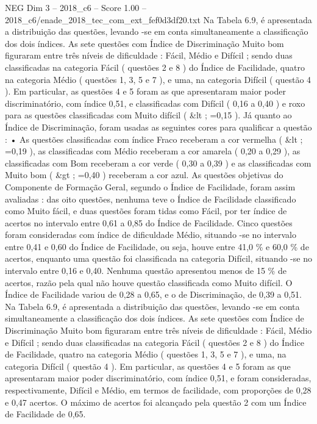 \begin{textsample}{NEG Dim 3 – 2018\_c6 – Score 1.00 – 2018\_c6/enade\_2018\_tec\_com\_ext\_fef0d3df20.txt}
Na Tabela 6.9, é apresentada a distribuição das questões, levando -se em conta simultaneamente a classificação dos dois índices.
As sete questões com Índice de Discriminação Muito bom figuraram entre três níveis de dificuldade : Fácil, Médio e Difícil ; sendo duas classificadas na categoria Fácil ( questões 2 e 8 ) do Índice de Facilidade, quatro na categoria Médio ( questões 1, 3, 5 e 7 ), e uma, na categoria Difícil ( questão 4 ).
Em particular, as questões 4 e 5 foram as que apresentaram maior poder discriminatório, com índice 0,51, e classificadas com Difícil ( 0,16 a 0,40 ) e roxo para as questões classificadas com Muito difícil ( \&lt ; =0,15 ).
Já quanto ao Índice de Discriminação, foram usadas as seguintes cores para qualificar a questão : • As questões classificadas com índice Fraco receberam a cor vermelha ( \&lt ; =0,19 ), as classificadas com Médio receberam a cor amarela ( 0,20 a 0,29 ), as classificadas com Bom receberam a cor verde ( 0,30 a 0,39 ) e as classificadas com Muito bom ( \&gt ; =0,40 ) receberam a cor azul.
As questões objetivas do Componente de Formação Geral, segundo o Índice de Facilidade, foram assim avaliadas : das oito questões, nenhuma teve o Índice de Facilidade classificado como Muito fácil, e duas questões foram tidas como Fácil, por ter índice de acertos no intervalo entre 0,61 a 0,85 do Índice de Facilidade.
Cinco questões foram consideradas com índice de dificuldade Médio, situando -se no intervalo entre 0,41 e 0,60 do Índice de Facilidade, ou seja, houve entre 41,0 \% e 60,0 \% de acertos, enquanto uma questão foi classificada na categoria Difícil, situando -se no intervalo entre 0,16 e 0,40.
Nenhuma questão apresentou menos de 15 \% de acertos, razão pela qual não houve questão classificada como Muito difícil.
O Índice de Facilidade variou de 0,28 a 0,65, e o de Discriminação, de 0,39 a 0,51.
Na Tabela 6.9, é apresentada a distribuição das questões, levando -se em conta simultaneamente a classificação dos dois índices.
As sete questões com Índice de Discriminação Muito bom figuraram entre três níveis de dificuldade : Fácil, Médio e Difícil ; sendo duas classificadas na categoria Fácil ( questões 2 e 8 ) do Índice de Facilidade, quatro na categoria Médio ( questões 1, 3, 5 e 7 ), e uma, na categoria Difícil ( questão 4 ).
Em particular, as questões 4 e 5 foram as que apresentaram maior poder discriminatório, com índice 0,51, e foram consideradas, respectivamente, Difícil e Médio, em termos de facilidade, com proporções de 0,28 e 0,47 acertos.
O máximo de acertos foi alcançado pela questão 2 com um Índice de Facilidade de 0,65.

\end{textsample}
